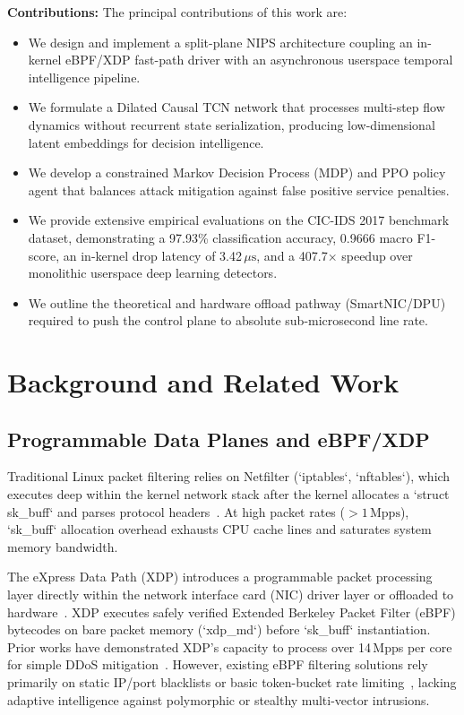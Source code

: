 \documentclass[conference,10pt]{IEEEtran}
\begin{document}
\textbf{Contributions:} The principal contributions of this work are:
\begin{itemize}
    \item We design and implement a split-plane NIPS architecture coupling an in-kernel eBPF/XDP fast-path driver with an asynchronous userspace temporal intelligence pipeline.
    \item We formulate a Dilated Causal TCN network that processes multi-step flow dynamics without recurrent state serialization, producing low-dimensional latent embeddings for decision intelligence.
    \item We develop a constrained Markov Decision Process (MDP) and PPO policy agent that balances attack mitigation against false positive service penalties.
    \item We provide extensive empirical evaluations on the CIC-IDS 2017 benchmark dataset, demonstrating a 97.93\% classification accuracy, 0.9666 macro F1-score, an in-kernel drop latency of 3.42\,$\mu\text{s}$, and a 407.7$\times$ speedup over monolithic userspace deep learning detectors.
    \item We outline the theoretical and hardware offload pathway (SmartNIC/DPU) required to push the control plane to absolute sub-microsecond line rate.
\end{itemize}

\section{Background and Related Work}

\subsection{Programmable Data Planes and eBPF/XDP}
Traditional Linux packet filtering relies on Netfilter (`iptables`, `nftables`), which executes deep within the kernel network stack after the kernel allocates a `struct sk_buff` and parses protocol headers~\cite{mccanne1993bsd}. At high packet rates ($> 1\,\text{Mpps}$), `sk_buff` allocation overhead exhausts CPU cache lines and saturates system memory bandwidth.

The eXpress Data Path (XDP) introduces a programmable packet processing layer directly within the network interface card (NIC) driver layer or offloaded to hardware~\cite{hoiland2018express}. XDP executes safely verified Extended Berkeley Packet Filter (eBPF) bytecodes on bare packet memory (`xdp_md`) before `sk_buff` instantiation. Prior works have demonstrated XDP's capacity to process over 14\,Mpps per core for simple DDoS mitigation~\cite{vieira2020fast, miano2021framework}. However, existing eBPF filtering solutions rely primarily on static IP/port blacklists or basic token-bucket rate limiting~\cite{scholz2021performance}, lacking adaptive intelligence against polymorphic or stealthy multi-vector intrusions.
\end{document}
